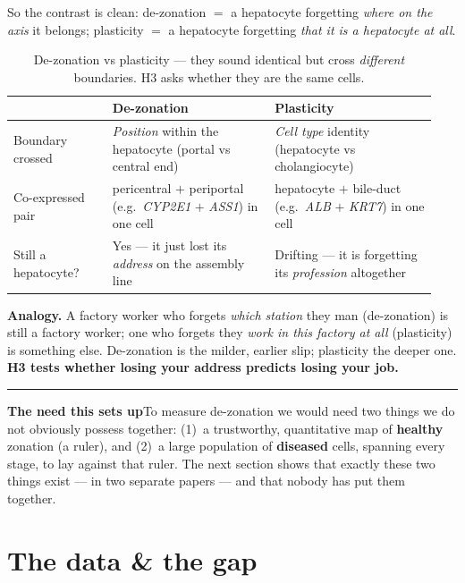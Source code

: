\documentclass[11pt]{article}
\newcommand{\aside}[2]{\par\medskip\noindent\textcolor{teal0}{\rule{2pt}{\baselineskip}}\quad\textbf{\textcolor{teal0}{#1}}\quad #2\par\medskip}
\newcommand{\gene}[1]{\textit{#1}}
\begin{document}
So the contrast is clean: de-zonation $=$ a hepatocyte forgetting \emph{where on the axis} it belongs;
plasticity $=$ a hepatocyte forgetting \emph{that it is a hepatocyte at all}.

\begin{table}[h]
\centering\small
\caption{De-zonation vs plasticity --- they sound identical but cross \emph{different} boundaries.
H3 asks whether they are the same cells.}
\label{tab:dezvsplast}
\begin{tabular}{@{}p{0.22\linewidth} p{0.36\linewidth} p{0.36\linewidth}@{}}
\toprule
 & \textbf{De-zonation} & \textbf{Plasticity}\\
\midrule
Boundary crossed & \emph{Position} within the hepatocyte (portal vs central end) & \emph{Cell type}
identity (hepatocyte vs cholangiocyte)\\
Co-expressed pair & pericentral $+$ periportal (e.g.\ \gene{CYP2E1} $+$ \gene{ASS1}) in one cell &
hepatocyte $+$ bile-duct (e.g.\ \gene{ALB} $+$ \gene{KRT7}) in one cell\\
Still a hepatocyte? & Yes --- it just lost its \emph{address} on the assembly line & Drifting --- it
is forgetting its \emph{profession} altogether\\
\bottomrule
\end{tabular}
\end{table}

\textbf{Analogy.} A factory worker who forgets \emph{which station} they man (de-zonation) is still a
factory worker; one who forgets they \emph{work in this factory at all} (plasticity) is something else.
De-zonation is the milder, earlier slip; plasticity the deeper one. \textbf{H3 tests whether losing
your address predicts losing your job.}

\aside{The need this sets up}{To measure de-zonation we would need two things we do not obviously
possess together: (1)~a trustworthy, quantitative map of \textbf{healthy} zonation (a ruler), and
(2)~a large population of \textbf{diseased} cells, spanning every stage, to lay against that ruler.
The next section shows that exactly these two things exist --- in two separate papers --- and that
nobody has put them together.}

\clearpage
\section{The data \& the gap}
\end{document}
